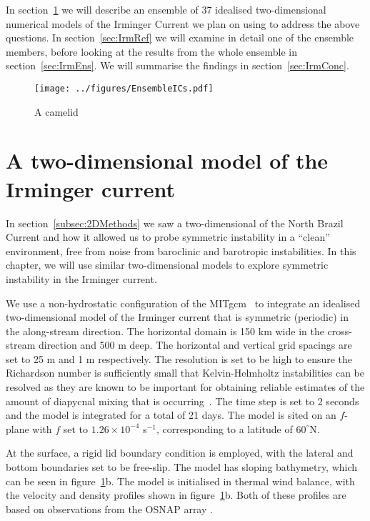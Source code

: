 In section~\ref{sec:Irm2DMeth} we will describe an ensemble of 37 idealised two-dimensional numerical models of the Irminger Current we plan on using to address the above questions. In section~\ref{sec:IrmRef} we will examine in detail one of the ensemble members, before looking at the results from the whole ensemble in section~\ref{sec:IrmEns}. We will summarise the findings in section~\ref{sec:IrmConc}.

\begin{figure} 
    \centering
    \texttt{[image: ../figures/EnsembleICs.pdf]}
    \caption{A camelid}
    \label{fig:EnsembleICs}
\end{figure}

\section{A two-dimensional model of the Irminger current}
\label{sec:Irm2DMeth}
In section~\ref{subsec:2DMethods} we saw a two-dimensional of the North Brazil Current and how it allowed us to probe symmetric instability in a ``clean'' environment, free from noise from baroclinic and barotropic instabilities. In this chapter, we will use similar two-dimensional models to explore symmetric instability in the Irminger current.

We use a non-hydrostatic configuration of the MITgcm~\citep{Marshall1997} to integrate an idealised two-dimensional model of the Irminger current that is symmetric (periodic) in the along-stream direction. The horizontal domain is 150 km wide in the cross-stream direction and 500 m deep. The horizontal and vertical grid spacings are set to 25 m and 1 m respectively. The resolution is set to be high to ensure the Richardson number is sufficiently small that Kelvin-Helmholtz instabilities can be resolved as they are known to be important for obtaining reliable estimates of the amount of diapycnal mixing that is occurring~\citep{Griffiths2003a, Yankovsky2019}. The time step is set to 2 seconds and the model is integrated for a total of 21 days. The model is sited on an $f$-plane with $f$ set to $1.26 \times 10^{-4}$ s$^{-1}$, corresponding to a latitude of $60^\circ$N. 

At the surface, a rigid lid boundary condition is employed, with the lateral and bottom boundaries set to be free-slip. The model has sloping bathymetry, which can be seen in  figure~\ref{fig:EnsembleICs}b. The model is initialised in thermal wind balance, with the velocity and density profiles shown in figure~\ref{fig:EnsembleICs}b. Both of these profiles are based on observations from the OSNAP array \citet{LeBras2022}.

